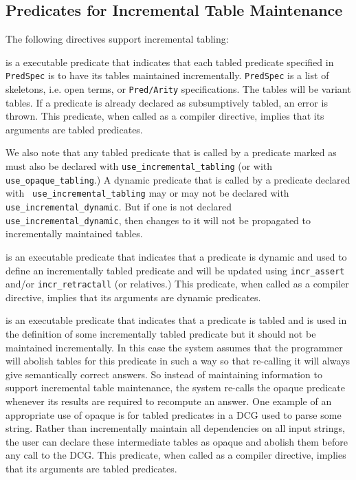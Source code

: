 \subsection{Predicates for Incremental Table Maintenance}

The following directives support incremental tabling:

\begin{description}
is a executable predicate that indicates that each tabled predicate
specified in {\tt PredSpec} is to have its tables maintained
incrementally.  {\tt PredSpec} is a list of skeletons, i.e. open
terms, or {\tt Pred/Arity} specifications.  The tables will be variant
tables.  If a predicate is already declared as subsumptively tabled,
an error is thrown.  This predicate, when called as a compiler
directive, implies that its arguments are tabled predicates.

We also note that any tabled predicate that is called by a predicate
marked as  must also be declared with
{\tt use\_incremental\_tabling} (or with {\tt use\_opaque\_tabling}.)
A dynamic predicate that is called by a predicate declared with {\tt
use\_incremental\_tabling} may or may not be declared with {\tt
use\_incremental\_dynamic}.  But if one is not declared {\tt
use\_incremental\_dynamic}, then changes to it will not be propagated
to incrementally maintained tables.

is an executable predicate that indicates that a predicate is dynamic
and used to define an incrementally tabled predicate and will be
updated using {\tt incr\_assert} and/or {\tt incr\_retractall} (or
relatives.)  This predicate, when called as a compiler directive,
implies that its arguments are dynamic predicates.

is an executable predicate that indicates that a predicate is tabled
and is used in the definition of some incrementally tabled predicate
but it should not be maintained incrementally.  In this case the
system assumes that the programmer will abolish tables for this
predicate in such a way so that re-calling it will always give
semantically correct answers.  So instead of maintaining information
to support incremental table maintenance, the system re-calls the
opaque predicate whenever its results are required to recompute an
answer.  One example of an appropriate use of opaque is for tabled
predicates in a DCG used to parse some string.  Rather than
incrementally maintain all dependencies on all input strings, the user
can declare these intermediate tables as opaque and abolish them
before any call to the DCG.  This predicate, when called as a compiler
directive, implies that its arguments are tabled predicates.

\end{description}

